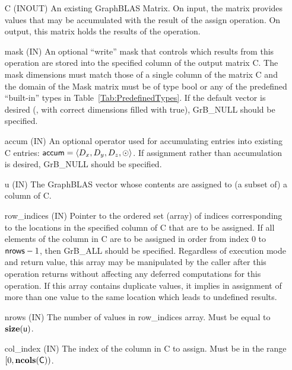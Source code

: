 \begin{itemize}[leftmargin=1.1in]
    \item[{\sf C}]    ({\sf INOUT}) An existing GraphBLAS Matrix.  On input,
    the matrix provides values that may be accumulated with the result of the
    assign operation.  On output, this matrix holds the results of the
    operation.

    \item[{\sf mask}] ({\sf IN}) An optional ``write'' mask that controls which
    results from this operation are stored into the specified column of the output matrix {\sf C}. The 
    mask dimensions must match those of a single column of the matrix {\sf C} and the domain of the 
    {\sf Mask} matrix must be of type {\sf bool} or any of the predefined 
    ``built-in'' types in Table~\ref{Tab:PredefinedTypes}.  If the default
    vector is desired (\ie, with correct dimensions filled with {\sf true}), 
    {\sf GrB\_NULL} should be specified.

    \item[{\sf accum}]    ({\sf IN}) An optional operator used for accumulating
    entries into existing {\sf C} entries: ${\sf accum} = \langle D_x,
    D_y, D_z,\odot \rangle$. If assignment rather than accumulation is
    desired, {\sf GrB\_NULL} should be specified.

    \item[{\sf u}]       ({\sf IN}) The GraphBLAS vector whose contents are 
    assigned to (a subset of) a column of {\sf C}.

    \item[{\sf row\_indices}]  ({\sf IN}) Pointer to the ordered set (array) of 
    indices corresponding to the locations in the specified column of {\sf C} 
    that are to be assigned.  If all elements of the column in {\sf C} are to be 
    assigned in order from index $0$ to ${\sf nrows} - 1$, then {\sf GrB\_ALL} should be 
    specified.  Regardless of execution mode and return value, this array may be
    manipulated by the caller after this operation returns without affecting any 
    deferred computations for this operation.
    If this array contains duplicate values, it implies in assignment of more 
    than one value to the same location which leads to undefined results.
    
    \item[{\sf nrows}] ({\sf IN}) The number of values in {\sf row\_indices} array.
    Must be equal to $\bold{size}({\sf u})$.
    
    \item[{\sf col\_index}]  ({\sf IN}) The index of the column in {\sf C} to 
    assign. Must be in the range $[0, \bold{ncols}({\sf C}))$.


\end{itemize}
